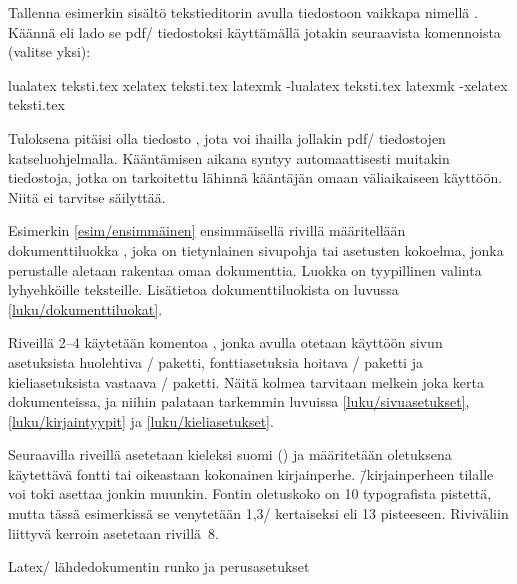 Tallenna esimerkin sisältö tekstieditorin avulla tiedostoon vaikkapa
nimellä . Käännä eli lado se pdf\-/ tiedostoksi
käyttämällä jotakin seuraavista komennoista (valitse yksi):

\begin{koodilohkosis}
lualatex teksti.tex
xelatex  teksti.tex
latexmk -lualatex teksti.tex
latexmk -xelatex  teksti.tex
\end{koodilohkosis}

\noindent
Tuloksena pitäisi olla tiedosto , jota voi
ihailla jollakin pdf\-/ tiedostojen katseluohjelmalla. Kääntämisen
aikana syntyy automaattisesti muitakin tiedostoja, jotka on tarkoitettu
lähinnä kääntäjän omaan väliaikaiseen käyttöön. Niitä ei tarvitse
säilyttää.

Esimerkin \ref{esim/ensimmäinen} ensimmäisellä rivillä määritellään
dokumenttiluokka , joka on tietynlainen sivupohja tai
asetusten kokoelma, jonka perustalle aletaan rakentaa omaa dokumenttia.
Luokka  on tyypillinen valinta lyhyehköille teksteille.
Lisätietoa dokumenttiluokista on luvussa \ref{luku/dokumenttiluokat}.

Riveillä 2--4 käytetään komentoa , jonka avulla
otetaan käyttöön sivun asetuksista huolehtiva \-/
paketti, fonttiasetuksia hoitava \-/ paketti ja
kieliasetuksista vastaava \-/ paketti. Näitä kolmea
tarvitaan melkein joka kerta dokumenteissa, ja niihin palataan tarkemmin
luvuissa \ref{luku/sivuasetukset}, \ref{luku/kirjaintyypit} ja
\ref{luku/kieliasetukset}.

Seuraavilla riveillä asetetaan kieleksi suomi () ja
määritetään oletuksena käytettävä fontti tai oikeastaan kokonainen
kirjainperhe.  \=/kirjainperheen tilalle voi
toki asettaa jonkin muunkin. Fontin oletuskoko on 10 typografista
pistettä, mutta tässä esimerkissä se venytetään 1,3\-/ kertaiseksi eli
13 pisteeseen. Riviväliin liittyvä kerroin asetetaan rivillä~8.

\begin{esimerkki*}

  \caption{Latex\-/ lähdedokumentin runko ja perusasetukset}
  \label{esim/ensimmäinen}
\end{esimerkki*}

